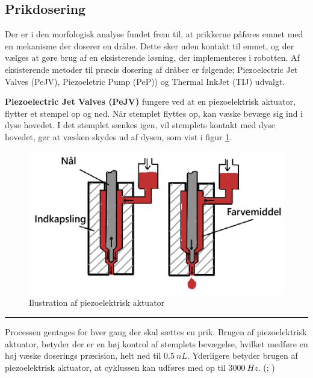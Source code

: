 \subsection{Prikdosering} \label{Prikplacering}
Der er i den morfologisk analyse fundet frem til, at prikkerne påføres emnet med en mekanisme der doserer en dråbe. Dette sker uden kontakt til emnet, og der vælges at gøre brug af en eksisterende løsning, der implementeres i robotten. Af eksisterende metoder til præcis dosering af dråber er følgende; Piezoelectric Jet Valves (PeJV), Piezoeletric Pump (PeP)) og Thermal InkJet (TIJ) udvalgt. 




\textbf{Piezoelectric Jet Valves (PeJV)} fungere ved at en piezoelektrisk aktuator, flytter et stempel op og ned. Når stemplet flyttes op, kan væske bevæge sig ind i dyse hovedet. I det stemplet sænkes igen, vil stemplets kontakt med dyse hovedet, gør at væsken skydes ud af dysen, som vist i figur \ref{fig:PeJV}.

\begin{figure}[H]
    \centering
    \includegraphics[width=0.6\linewidth]{Sections/5 Konceptgenerering/Media/PEJV.png}
    \caption{Ilustration af piezoelektrisk aktuator}
    \label{fig:PeJV}
\end{figure} \plainbreak{-.5}

 Processen gentages for hver gang der skal sættes en prik. Brugen af piezoelektrisk aktuator, betyder der er en høj kontrol af stemplets bevægelse, hvilket medføre en høj væske doserings præcision, helt ned til \(\SI{0,5}{nL}\). Yderligere betyder brugen af piezoelektrisk aktuator, at cyklussen kan udføres med op til \(\SI{3000}{Hz}\). (\cite{VIEWEG2025JetDV-6210}; \cite{Hoath2016FundamentalsDroplets})


